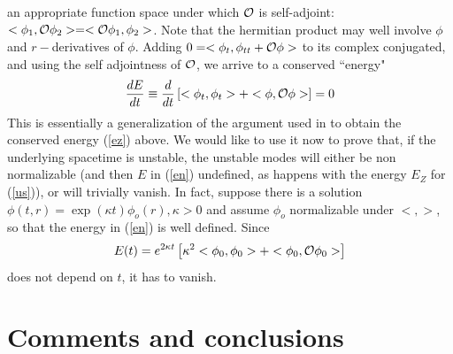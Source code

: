 \documentclass[12pt,aps,floats,showpacs,amssymb,tightenlines]{revtex4}
\renewcommand{\o}{{\cal{O}}}
\begin{document}
an appropriate function space under which $\o$ is self-adjoint:
$<\phi_1,\o \phi_2> = <\o \phi_1,\phi_2>$. Note that the  hermitian
product may  well involve $\phi$ and $r-$derivatives of $\phi$.
Adding  $0 = <\phi_t,\phi_{tt} + \o \phi>$ to its complex
conjugated, and using the self adjointness of $\o$, we arrive to a
conserved ``energy"
\begin{equation} \label{en}
\frac{d E}{d t} \equiv \frac{d}{dt} \left[ <\phi_t,\phi_t> + <\phi,
\o\phi> \right] = 0
\end{equation}
This  is essentially a generalization of the argument used in
\cite{chandra} to obtain the conserved energy (\ref{ez}) above. We
would like to use it now to prove that, if the underlying spacetime
is unstable,  the unstable modes will either be non normalizable
(and then $E$ in (\ref{en}) undefined, as happens with the energy
$E_Z$ for (\ref{us})), or will trivially vanish. In fact, suppose
there is a solution $\phi(t,r) = \exp(\kappa t) \phi_o(r), \kappa
>0$ and assume $\phi_o$ normalizable under $<,>$, so that the energy in
(\ref{en}) is well defined. Since
$$ E(t) = e^{2 \kappa t} \left[ \kappa^2 < \phi_0,\phi_0> + <\phi_0, \o \phi_0>
\right]$$ does not depend on $t$, it has to vanish.








\section{Comments and conclusions} \label{cc}
\end{document}

